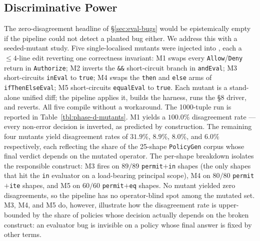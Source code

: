 
\subsection{Discriminative Power}
\label{sec:eval-discriminative}

The zero-disagreement headline of \S\ref{sec:eval-bugs} would be
epistemically empty if the pipeline could not detect a planted bug
either. We address this with a seeded-mutant study. Five
single-localised mutants were injected into \cedargo, each a
$\le\!4$-line edit reverting one correctness invariant: M1 swaps
every \texttt{Allow}/\texttt{Deny} return in
\texttt{Authorize}; M2 inverts the \texttt{\&\&} short-circuit branch
in \texttt{andEval}; M3 short-circuits \texttt{inEval} to
\texttt{true}; M4 swaps the \texttt{then} and \texttt{else} arms of
\texttt{ifThenElseEval}; M5 short-circuits \texttt{equalEval} to
\texttt{true}. Each mutant is a stand-alone unified diff; the
pipeline applies it, builds the harness, runs the §8 driver, and
reverts. All five compile without a workaround.
%
The 1000-tuple run is reported in
Table~\ref{tbl:phase-d-mutants}. M1 yields a $100.0\%$ disagreement
rate — every non-error decision is inverted, as predicted by
construction. The remaining four mutants yield disagreement rates
of $31.9\%$, $8.9\%$, $8.0\%$, and $6.0\%$ respectively, each
reflecting the share of the 25-shape \texttt{PolicyGen} corpus whose
final verdict depends on the mutated operator. The per-shape
breakdown isolates the responsible construct: M3 fires on
$89 / 89$ \texttt{permit$+$in} shapes (the only shapes that hit
the \texttt{in} evaluator on a load-bearing principal scope), M4 on
$80 / 80$ \texttt{permit$+$ite} shapes, and M5 on $60 / 60$
\texttt{permit$+$eq} shapes. No mutant yielded zero disagreements,
so the pipeline has no operator-blind spot among the mutated set.
M3, M4, and M5 do, however, illustrate how the disagreement rate is
upper-bounded by the share of policies whose decision actually
depends on the broken construct: an evaluator bug is invisible on a
policy whose final answer is fixed by other terms.

